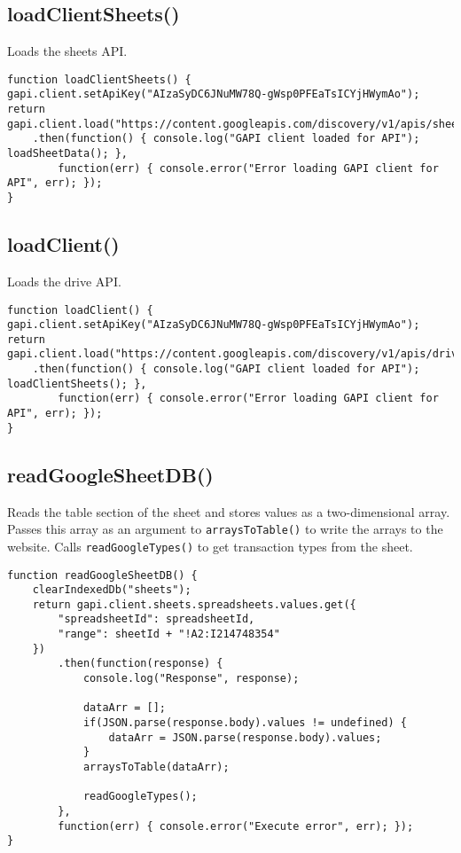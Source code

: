 \documentclass[letterpaper]{article}
\begin{document}
\subsection{loadClientSheets()}

Loads the sheets API.

\begin{lstlisting}[firstnumber=90]
function loadClientSheets() {
gapi.client.setApiKey("AIzaSyDC6JNuMW78Q-gWsp0PFEaTsICYjHWymAo");
return gapi.client.load("https://content.googleapis.com/discovery/v1/apis/sheets/v4/rest")
    .then(function() { console.log("GAPI client loaded for API"); loadSheetData(); },
        function(err) { console.error("Error loading GAPI client for API", err); });
}
\end{lstlisting}

\subsection{loadClient()}

Loads the drive API.

\begin{lstlisting}[firstnumber=97]
function loadClient() {
gapi.client.setApiKey("AIzaSyDC6JNuMW78Q-gWsp0PFEaTsICYjHWymAo");
return gapi.client.load("https://content.googleapis.com/discovery/v1/apis/drive/v3/rest")
    .then(function() { console.log("GAPI client loaded for API"); loadClientSheets(); },
        function(err) { console.error("Error loading GAPI client for API", err); });
}
\end{lstlisting}

\subsection{readGoogleSheetDB()}

Reads the table section of the sheet and stores values as a two-dimensional array.
Passes this array as an argument to \lstinline{arraysToTable()} to write the arrays to the website.
Calls \lstinline{readGoogleTypes()} to get transaction types from the sheet.

\begin{lstlisting}[firstnumber=104]
function readGoogleSheetDB() {
    clearIndexedDb("sheets");
    return gapi.client.sheets.spreadsheets.values.get({
        "spreadsheetId": spreadsheetId,
        "range": sheetId + "!A2:I214748354"
    })
        .then(function(response) {
            console.log("Response", response);

            dataArr = [];
            if(JSON.parse(response.body).values != undefined) {
                dataArr = JSON.parse(response.body).values;
            }
            arraysToTable(dataArr);

            readGoogleTypes();
        },
        function(err) { console.error("Execute error", err); });
}
\end{lstlisting}
\end{document}
